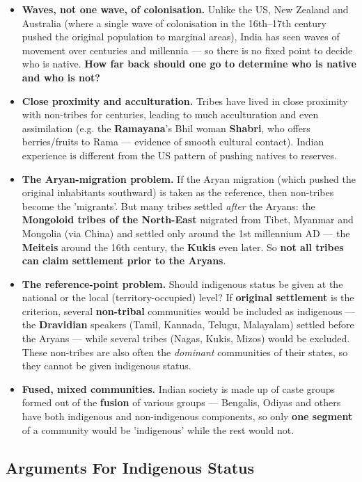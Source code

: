 \begin{itemize}
\item \textbf{Waves, not one wave, of colonisation.} Unlike the US, New Zealand and Australia (where a single wave of colonisation in the 16th--17th century pushed the original population to marginal areas), India has seen waves of movement over centuries and millennia --- so there is no fixed point to decide who is native. \textbf{How far back should one go to determine who is native and who is not?}
\item \textbf{Close proximity and acculturation.} Tribes have lived in close proximity with non-tribes for centuries, leading to much acculturation and even assimilation (e.g. the \textbf{Ramayana}'s Bhil woman \textbf{Shabri}, who offers berries/fruits to Rama --- evidence of smooth cultural contact). Indian experience is different from the US pattern of pushing natives to reserves.
\item \textbf{The Aryan-migration problem.} If the Aryan migration (which pushed the original inhabitants southward) is taken as the reference, then non-tribes become the 'migrants'. But many tribes settled \emph{after} the Aryans: the \textbf{Mongoloid tribes of the North-East} migrated from Tibet, Myanmar and Mongolia (via China) and settled only around the 1st millennium AD --- the \textbf{Meiteis} around the 16th century, the \textbf{Kukis} even later. So \textbf{not all tribes can claim settlement prior to the Aryans}.
\item \textbf{The reference-point problem.} Should indigenous status be given at the national or the local (territory-occupied) level? If \textbf{original settlement} is the criterion, several \textbf{non-tribal} communities would be included as indigenous --- the \textbf{Dravidian} speakers (Tamil, Kannada, Telugu, Malayalam) settled before the Aryans --- while several tribes (Nagas, Kukis, Mizos) would be excluded. These non-tribes are also often the \emph{dominant} communities of their states, so they cannot be given indigenous status.
\item \textbf{Fused, mixed communities.} Indian society is made up of caste groups formed out of the \textbf{fusion} of various groups --- Bengalis, Odiyas and others have both indigenous and non-indigenous components, so only \textbf{one segment} of a community would be 'indigenous' while the rest would not.
\end{itemize}

\subsection{Arguments For Indigenous Status}

